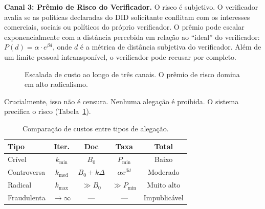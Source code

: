\documentclass[11pt,a4paper,twocolumn]{article}
\begin{document}
\textbf{Canal 3: Prêmio de Risco do Verificador.} O risco é subjetivo. O verificador avalia se as políticas declaradas do DID solicitante conflitam com os interesses comerciais, sociais ou políticos do próprio verificador. O prêmio pode escalar exponencialmente com a distância percebida em relação ao ``ideal'' do verificador: $P(d) = \alpha \cdot e^{\beta d}$, onde $d$ é a métrica de distância subjetiva do verificador. Além de um limite pessoal intransponível, o verificador pode recusar por completo.

\begin{figure}[ht]
\centering
{}
\caption{Escalada de custo ao longo de três canais. O prêmio de risco domina em alto radicalismo.}
\label{fig:radicalism}
\end{figure}

Crucialmente, isso não é censura. Nenhuma alegação é proibida. O sistema precifica o risco (Tabela~\ref{tab:costs}).

\begin{table}[ht]
\centering
\caption{Comparação de custos entre tipos de alegação.}
\label{tab:costs}
\footnotesize
\begin{tabular}{@{}lcccc@{}}
\toprule
\textbf{Tipo} & \textbf{Iter.} & \textbf{Doc} & \textbf{Taxa} & \textbf{Total} \\
\midrule
Crível & $k_{\min}$ & $B_0$ & $P_{\min}$ & Baixo \\
Controversa & $k_{\text{med}}$ & $B_0{+}k\Delta$ & $\alpha e^{\beta d}$ & Moderado \\
Radical & $k_{\max}$ & $\gg B_0$ & $\gg P_{\min}$ & Muito alto \\
Fraudulenta & $\to\infty$ & --- & --- & Impublicável \\
\bottomrule
\end{tabular}
\end{table}
\end{document}
